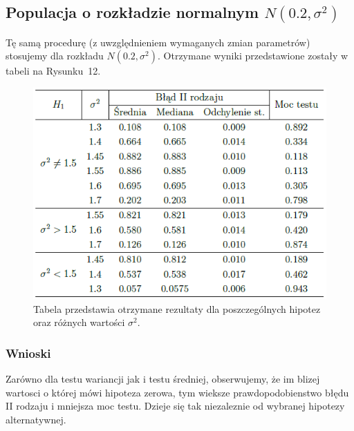\documentclass{article}
\begin{document}
\subsection{Populacja o rozkładzie normalnym $N(0.2, \sigma^2)$}
Tę samą procedurę (z uwzględnieniem wymaganych zmian parametrów) stosujemy dla rozkładu $N(0.2, \sigma^2)$. Otrzymane wyniki przedstawione zostały w tabeli na Rysunku~12.
\begin{figure}[H]
    \centering
    \includegraphics[scale=0.65]{tabelka_var2.png}
    \caption{Tabela przedstawia otrzymane rezultaty dla poszczególnych hipotez oraz różnych wartości $\sigma^2$.}
    \label{fig:6}
\end{figure}
\subsubsection{Wnioski}
Zarówno dla testu wariancji jak i testu średniej, obserwujemy, że im blizej
wartosci o której mówi hipoteza zerowa, tym wieksze prawdopodobienstwo błędu II rodzaju
i mniejsza moc testu. Dzieje się tak niezaleznie od wybranej hipotezy alternatywnej.
\end{document}
